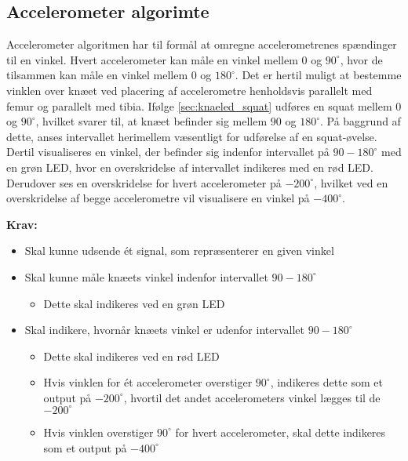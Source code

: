 \subsection{Accelerometer algorimte}
Accelerometer algoritmen har til formål at omregne accelerometrenes spændinger til en vinkel. Hvert accelerometer kan måle en vinkel mellem 0 og $90^{\circ}$, hvor de tilsammen kan måle en vinkel mellem 0 og $180^{\circ}$. Det er hertil muligt at bestemme vinklen over knæet ved placering af accelerometre henholdsvis parallelt med femur og parallelt med tibia. 
Ifølge \autoref{sec:knaeled_squat} udføres en squat mellem $0$ og $90^{\circ}$, hvilket svarer til, at knæet befinder sig mellem $90$ og $180^{\circ}$. På baggrund af dette, anses intervallet herimellem væsentligt for udførelse af en squat-øvelse. Dertil visualiseres en vinkel, der befinder sig indenfor intervallet på $90-180^{\circ}$ med en grøn LED, hvor en overskridelse af intervallet indikeres med en rød LED. Derudover ses en overskridelse for hvert accelerometer på $-200^{\circ}$, hvilket ved en overskridelse af begge accelerometre vil visualisere en vinkel på $-400^{\circ}$.
 
\vspace{3mm}
\textbf{Krav:}
\begin{itemize}
\item Skal kunne udsende ét signal, som repræsenterer en given vinkel
\item Skal kunne måle knæets vinkel indenfor intervallet $90-180^{\circ}$
\begin{itemize}
\item Dette skal indikeres ved en grøn LED
\end{itemize}
\item Skal indikere, hvornår knæets vinkel er udenfor intervallet $90-180^{\circ}$
\begin{itemize}
\item Dette skal indikeres ved en rød LED
\item Hvis vinklen for ét accelerometer overstiger $90^{\circ}$, indikeres dette som et output på $-200^{\circ}$, hvortil det andet accelerometers vinkel lægges til de $-200^{\circ}$
\item Hvis vinklen overstiger $90^{\circ}$ for hvert accelerometer, skal dette indikeres som et output på $-400^{\circ}$
\end{itemize}
\end{itemize}